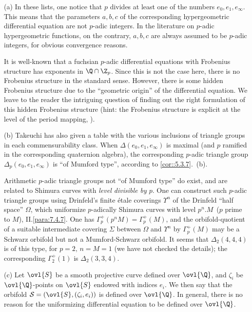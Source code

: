 \begin{rems}
 (a) In these lists, one notice that $p$ divides
 at least one of the numbers $e_0,e_1,e_\infty$. This means that the
 parameters $a,b,c$ of the corresponding hypergeometric differential
 equation are not $p$-adic integers. In the literature on $p$-adic
 hypergeometric functions, on the contrary, $a,b,c$ are always assumed to
 be $p$-adic integers, for obvious convergence reasons.

 It is well-known that a fuchsian $p$-adic differential equations with
 Frobenius structure has exponents in $\Q\cap \Z_p$. Since this is not
 the case here, there is no Frobenius structure in the standard
 sense. However, there is some hidden Frobenius structure due to the
 ``geometric origin'' of the differential equation. We leave to the
 reader the intriguing question of finding out the right formulation of
 this hidden Frobenius structure (hint: the Frobenius structure is
 explicit at the level of the period mapping, \cf \cite{tpuosc}).

 \medskip
 (b) Takeuchi has also given a table with the various
 inclusions of triangle groups in each commensurability class. When
 $\Delta(e_0,e_1,e_\infty)$ is maximal (and $p$ ramified in the
 corresponding quaternion algebra), the corresponding $p$-adic triangle
 group $\Delta_p(e_0,e_1,e_\infty)$ is ``of Mumford type'', according to
 \ref{cor::5.3.7}.~(b).

 Arithmetic $p$-adic triangle groups not ``of Mumford type'' do exist,
 and are related to Shimura curves with {\it level divisible by $p$}.
 One can construct such $p$-adic triangle groups using Drinfeld's finite
 \'etale coverings $\Upsilon^n$ of the Drinfeld ``half space'' $\Omega$,
 which uniformize $p$-adically Shimura curves with level $p^n.M\,$ ($p$
 prime to $M$), \cf II.\ref{para:7.4.7}.  One has
 $\Gamma_p^+(p^nM)=\Gamma_p^+( M)$, 
 and the orbifold-quotient of a suitable intermediate covering $\Sigma$
 between $\Omega$ and $\Upsilon^n$ by $\Gamma_p^+( M)$ may be a Schwarz
 orbifold but not a Mumford-Schwarz orbifold. It seems that
 $\Delta_2(4,4,4)$ is of this type, for $p=2, \,n=M=1$ (we have not
 checked the details); the corresponding $\Gamma_2^+(1)$ is
 $\Delta_2(3,3,4)$.

 \medskip
 (c) Let $\ovl{S}$ be a smooth projective curve defined
 over $\ovl{\Q}$, and $\zeta_i$ be $\ovl{\Q}$-points on $\ovl{S}$
 endowed with indices $e_i$. We then say that the orbifold
 ${\mathcal{S}}=(\ovl{S}, (\zeta_i,e_i))$ is defined over $\ovl{\Q}$. In
 general, there is no reason for the uniformizing differential equation
 to be defined over $\ovl{\Q}$.


\end{rems}

